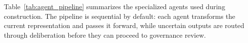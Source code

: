 \documentclass{article}
\begin{document}
Table~\ref{tab:agent_pipeline} summarizes the specialized agents used during construction. The pipeline is sequential by default: each agent transforms the current representation and passes it forward, while uncertain outputs are routed through deliberation before they can proceed to governance review.

\end{document}
